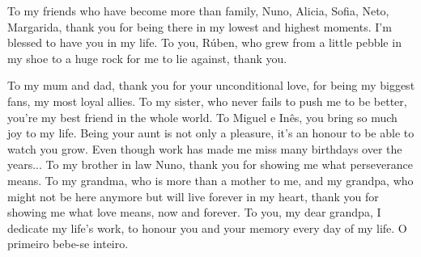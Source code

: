 To my friends who have become more than family, Nuno, Alicia, Sofia, Neto, Margarida, thank you for being there in my lowest and highest moments. I'm blessed to have you in my life. To you, Rúben, who grew from a little pebble in my shoe to a huge rock for me to lie against, thank you. 

To my mum and dad, thank you for your unconditional love, for being my biggest fans, my most loyal allies. To my sister, who never fails to push me to be better, you're my best friend in the whole world. To Miguel e Inês, you bring so much joy to my life. Being your aunt is not only a pleasure, it's an honour to be able to watch you grow. Even though work has made me miss many birthdays over the years... To my brother in law Nuno, thank you for showing me what perseverance means. To my grandma, who is more than a mother to me, and my grandpa, who might not be here anymore but will live forever in my heart, thank you for showing me what love means, now and forever. To you, my dear grandpa, I dedicate my life's work, to honour you and your memory every day of my life. O primeiro bebe-se inteiro. 